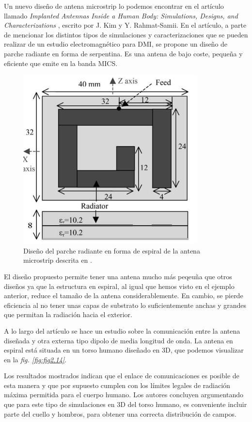 Un nuevo diseño de antena microstrip lo podemos encontrar en el artículo llamado \textit{Implanted Antennas Inside a Human Body: Simulations, Designs, and Characterizations} \cite{kim}, escrito por J. Kim y Y. Rahmat-Samii. En el artículo, a parte de mencionar los distintos tipos de simulaciones y caracterizaciones que se pueden realizar de un estudio electromagnético para DMI, se propone un diseño de parche radiante en forma de serpentina. Es una antena de bajo coste, pequeña y eficiente que emite en la banda MICS.

\begin{figure}[!htb]
    \centering
    \includegraphics[scale=0.4]{./ContextoTecnologico/articulos/kim1}
    \caption{Diseño del parche radiante en forma de espiral de la antena microstrip descrita en \cite{kim}.}
    \label{fig:fig2.13}
\end{figure}

El diseño propuesto permite tener una antena mucho más peqeuña que otros diseños ya que la estructura en espiral, al igual que hemos visto en el ejemplo anterior, reduce el tamaño de la antena considerablemente. En cambio, se pierde eficiencia al no tener unas capas de substrato lo suficientemente anchas y grandes que permitan la radiación hacia el exterior.

A lo largo del artículo se hace un estudio sobre la comunicación entre la antena diseñada y otra externa tipo dipolo de media longitud de onda. La antena en espiral está situada en un torso humano diseñado en 3D, que podemos visualizar en la \textit{fig. \ref{fig:fig2.14}}.

Los resultados mostrados indican que el enlace de comunicaciones es posible de esta manera y que por supuesto cumplen con los límites legales de radiación máxima permitida para el cuerpo humano. Los autores concluyen argumentando que para este tipo de simulaciones en 3D del torso humano, es conveniente incluir parte del cuello y hombros, para obtener una correcta distribución de campos.

